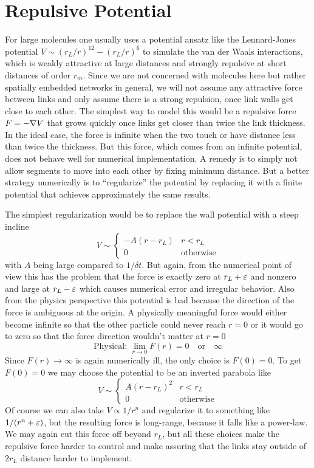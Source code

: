 \documentclass[nofootinbib,preprint,floatfix,titlepage,superscriptaddress]{revtex4} %
\begin{document}
\section{Repulsive Potential\label{ap:repel}}

For large molecules one usually uses a potential ansatz like the Lennard-Jones potential $V \sim (r_L/r)^{12} - (r_L/r)^6 $ to simulate the van der Waals interactions, which is weakly attractive at large distances and strongly repulsive at short distances of order $r_m$. Since we are not concerned with molecules here but rather spatially embedded networks in general, we will not assume any attractive force between links and only assume there is a strong repulsion, once link walls get close to each other. The simplest way to model this would be a repulsive force $F = -\nabla V$ that grows quickly once links get closer than twice the link thickness. In the ideal case, the force is infinite when the two touch or have distance less than twice the thickness. But this force, which comes from an infinite potential, does not behave well for numerical implementation. A remedy is to simply not allow segments to move into each other by fixing minimum distance. But a better strategy numerically is to ``regularize'' the potential by replacing it with a finite potential that achieves approximately the same results. 

The simplest regularization would be to replace the wall potential with a steep incline
\[V \sim \begin{cases} -A(r -r_L) & r< r_L \\
0 & \mbox{otherwise} 
\end{cases}\]
with $A$ being large compared to $1/\delta t$. 
But again, from the numerical point of view this has the problem that the force is exactly zero at $r_L+\varepsilon$ and nonzero and large at $r_L - \varepsilon$ which causes numerical error and irregular behavior. Also from the physics perspective this potential is bad because the direction of the force is ambiguous at the origin. A physically meaningful force would either become infinite so that the other particle could never reach $r=0$ or it would go to zero so that the force direction wouldn't matter at $r=0$
\[\mbox{Physical: } \lim_{r\to 0} F(r) = 0 \quad \mbox{or}\quad \infty \]
Since $F(r)\to \infty$ is again numerically ill, the only choice is $F(0) = 0$. To get $F(0) = 0$ we may choose the potential to be an inverted parabola like
\[V \sim \begin{cases} A(r -r_L)^2 & r< r_L \\
0 & \mbox{otherwise} 
\end{cases}\]
Of course we can also take $V\propto 1/r^n$ 
and regularize it to something like $1/(r^n+\varepsilon)$, but the resulting force is long-range, because it falls like a power-law. We may again cut this force off beyond $r_L$, but all these choices make the repulsive force harder to control and make assuring that the links stay outside of $2r_L$ distance harder to implement. 
\end{document}
